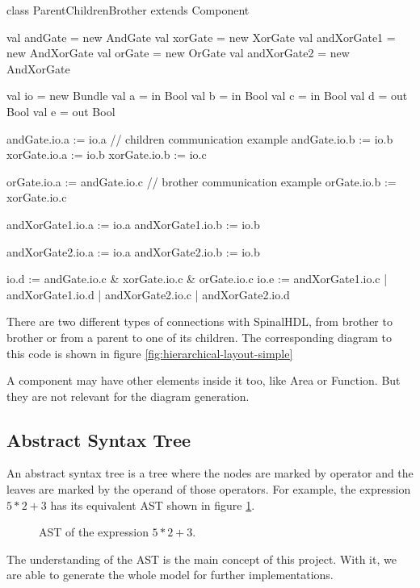 \begin{listing}
    \centering
    \begin{scalacode}
    class ParentChildrenBrother extends Component
    {
        val andGate = new AndGate
        val xorGate = new XorGate
        val andXorGate1 = new AndXorGate
        val orGate = new OrGate
        val andXorGate2 = new AndXorGate

        val io = new Bundle
        {
            val a = in Bool
            val b = in Bool
            val c = in Bool
            val d = out Bool
            val e = out Bool
        }

        andGate.io.a := io.a            // children communication example
        andGate.io.b := io.b
        xorGate.io.a := io.b
        xorGate.io.b := io.c

        orGate.io.a := andGate.io.c     // brother communication example
        orGate.io.b := xorGate.io.c     

        andXorGate1.io.a := io.a
        andXorGate1.io.b := io.b

        andXorGate2.io.a := io.a
        andXorGate2.io.b := io.b

        io.d := andGate.io.c & xorGate.io.c & orGate.io.c
        io.e := andXorGate1.io.c | andXorGate1.io.d | andXorGate2.io.c | andXorGate2.io.d
    }
    \end{scalacode}
    \caption[Type of connection in SpinalHDL]{There are two different types of
connections with SpinalHDL, from brother to brother or from a parent to
one of its children. The corresponding diagram to this code is shown in figure
\ref{fig:hierarchical-layout-simple}}
    \label{lst:HierarchicComponent-solo}
\end{listing}

A component may have other elements inside it too, like Area or Function. But
they are not relevant for the diagram generation.

\subsection{Abstract Syntax Tree}
\label{sub:Abstract Syntax Tree}

An abstract syntax tree is a tree where the nodes are marked by operator and the
leaves are marked by the operand of those operators. For example, the expression $5
* 2 + 3$ has its equivalent AST shown in figure \ref{fig:ast-example}.

\begin{figure}[H]
    \centering
    \caption[Example of an AST]{AST of the expression $5 * 2 + 3$.}
    \label{fig:ast-example}
  \end{figure}

The understanding of the AST is the main concept of this project. With it, we are
able to generate the whole model for further implementations.

